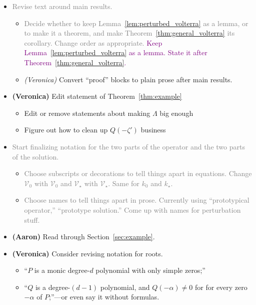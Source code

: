 \documentclass{article}
\theoremstyle{plain}
\newcommand{\volterra}{\mathcal{V}}
\newcommand{\hardpart}{\mathcal{V}_0}
\newcommand{\softpart}{\mathcal{V}_\star}
\newcommand{\hardker}{k_0}
\newcommand{\softker}{k_\star}
\newenvironment{brainstorm}{\color{violet}\begin{itemize}}{\end{itemize}\color{black}}
\begin{document}
\begin{brainstorm}
\begin{itemize}
        \color{violet}
        \item \textbf{(Aaron)} Confirm again that removed $\tau+\gamma$ upper bound on $\rho$ was unnecessary.
\end{itemize}
\item \textcolor{gray}{Revise text around main results.}
\begin{itemize}
    \item \textcolor{gray}{Decide whether to keep Lemma~\ref{lem:perturbed_volterra} as a lemma, or to make it a theorem, and make Theorem~\ref{thm:general_volterra} its corollary. Change order as appropriate.} \textcolor{purple}{Keep Lemma~\ref{lem:perturbed_volterra} as a lemma. State it after Theorem~\ref{thm:general_volterra}.}
    \color{gray}
    \item \textit{(Veronica)} Convert ``proof'' blocks to plain prose after main results. 
\end{itemize}
\color{gray}
\item \textbf{(Veronica)} Edit statement of Theorem~\ref{thm:example} 
\begin{itemize}
    \item Edit or remove statements about making $\Lambda$ big enough
    \item Figure out how to clean up $Q(-\zeta')$ business
\end{itemize}
\color{violet}
\item \textcolor{gray}{Start finalizing notation for the two parts of the operator and the two parts of the solution.}
\begin{itemize}
    \item \textcolor{gray}{Choose subscripts or decorations to tell things apart in equations.} \textcolor{gray}{Change $\hardpart$ with $\volterra_0$ and $\softpart$ with $\volterra_\star$. Same for $\hardker$ and $\softker$.}
    \item \textcolor{gray}{Choose names to tell things apart in prose. Currently using ``prototypical operator,'' ``prototype solution.'' Come up with names for perturbation stuff.}
\end{itemize}
\item \textbf{(Aaron)} Read through Section~\ref{sec:example}.
\color{gray}
\item \textbf{(Veronica)} Consider revising notation for roots. 
\begin{itemize}
\item ``$P$ is a monic degree-$d$ polynomial with only simple zeros;''
\item ``$Q$ is a degree-$(d-1)$ polynomial, and $Q(-\alpha) \neq 0$ for for every zero $-\alpha$ of $P$;''---or even say it without formulas.

\end{itemize}
\end{brainstorm}
\end{document}
